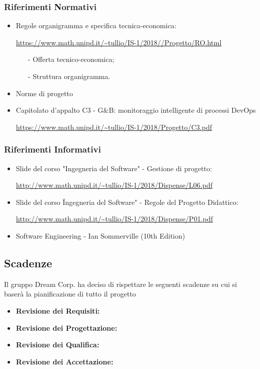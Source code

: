 			\subsubsection{Riferimenti Normativi}
				\begin{itemize}
					\item Regole organigramma e specifica tecnica-economica:

					\url{https://www.math.unipd.it/~tullio/IS-1/2018//Progetto/RO.html}
						\begin{itemize}
							\item[-] Offerta tecnico-economica;
							\item[-]Struttura organigramma.
						\end{itemize}
					\item Norme di progetto
					\item Capitolato d'appalto C3 - G\&B: monitoraggio intelligente di processi DevOps
					
					\url{https://www.math.unipd.it/~tullio/IS-1/2018/Progetto/C3.pdf}
				\end{itemize}
				
			\subsubsection{Riferimenti Informativi}
				\begin{itemize}
					\item Slide del corso "Ingegneria del Software" - Gestione di progetto:
					
					\url{http://www.math.unipd.it/~tullio/IS-1/2018/Dispense/L06.pdf}
					\item Slide del corso \"Ingegneria del Software" - Regole del Progetto Didattico:

					\url{http://www.math.unipd.it/~tullio/IS-1/2018/Dispense/P01.pdf}

					\item Software Engineering - Ian Sommerville (10th Edition)
				\end{itemize}

		\subsection{Scadenze}
			Il gruppo Dream Corp. ha deciso di rispettare le seguenti scadenze su cui si baserà la pianificazione di tutto il progetto
			\begin{itemize}
				\item \textbf{Revisione dei Requisiti:} 
				\item \textbf{Revisione dei Progettazione:} 
				\item \textbf{Revisione dei Qualifica:} 
				\item \textbf{Revisione dei Accettazione:} 
			\end{itemize}



	\newpage